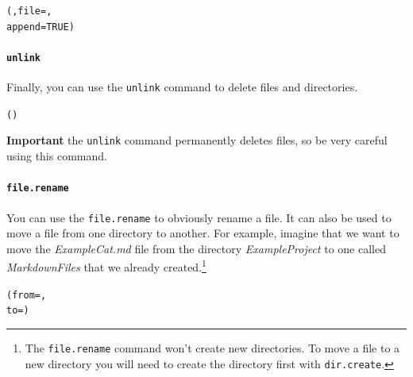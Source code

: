 \documentclass[krantz1]{krantz}
\begin{document}
\begin{knitrout}
\color{fgcolor}\begin{kframe}
\begin{alltt}
(, file = ,
    append = TRUE)
\end{alltt}
\end{kframe}
\end{knitrout}


\paragraph{{\tt{unlink}}}

Finally, you can use the {\tt{unlink}} command to delete files and directories. 

\begin{knitrout}
\color{fgcolor}\begin{kframe}
\begin{alltt}
()
\end{alltt}
\end{kframe}
\end{knitrout}


\noindent \textbf{Important} the \texttt{unlink} command permanently deletes files, so be very careful using this command.

\paragraph{{\tt{file.rename}}}

You can use the \texttt{file.rename} to obviously rename a file. It can also be used to move a file from one directory to another. For example, imagine that we want to move the \emph{ExampleCat.md} file from the directory \emph{ExampleProject} to one called \emph{MarkdownFiles} that we already created.\footnote{The \texttt{file.rename} command won't create new directories. To move a file to a new directory you will need to create the directory first with \texttt{dir.create}.}

\begin{knitrout}
\color{fgcolor}\begin{kframe}
\begin{alltt}
(from = , 
            to = )
\end{alltt}
\end{kframe}
\end{knitrout}
\end{document}
